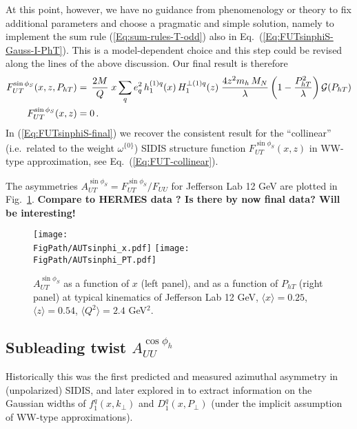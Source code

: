 \documentclass[a4paper,11pt]{article}
\newcommand{\blue}[1]{{\color{blue} #1}}
\newcommand{\la}{\langle}
\newcommand{\ra}{\rangle}
\newcommand{\PS}[1]{\blue{\bf\boldmath #1}}
\def\Phperp{P_{hT}}
\def\kperp{k_\perp}
\def\pperp{P_\perp}
\newcommand*{\FigPath}{./figs}%
\begin{document}
At this point, however, we have no guidance from phenomenology or theory 
to fix additional parameters and choose a pragmatic and simple solution, 
namely to implement the sum rule (\ref{Eq:sum-rules-T-odd}) also in 
Eq.~(\ref{Eq:FUTsinphiS-Gauss-I-PhT}). This is
a model-dependent choice and this step could be revised along the
lines of the above discussion. Our final result is therefore
\begin{alignat}{1}
	F_{UT}^{\sin\phi_S}(x,z,\Phperp) 
	&= \,\frac{2M}{Q}\;x\sum_q e_q^2\,
	h_1^{(1)q}(x)\,H_1^{\perp(1)q}(z)\; \frac{4z^2 m_h\,M_N}{\lambda} 
	\left(1-\frac{\Phperp^2}{\lambda}\right) {\cal G}(\Phperp) 
	\nonumber\\
  	F_{UT}^{\sin\phi_S}(x,z) 
	&= 0 \, .	\label{Eq:FUTsinphiS-final}
\end{alignat}
In (\ref{Eq:FUTsinphiS-final}) we recover the consistent result for 
the ``collinear'' (i.e.\ related to the weight $\omega^{\{0\}}$) SIDIS 
structure function $F_{UT}^{\sin\phi_S}(x,z)$ in WW-type approximation, 
see Eq.~(\ref{Eq:FUT-collinear}). 

The asymmetries $A_{UT}^{\sin\phi_S}=F_{UT}^{\sin\phi_S}/F_{UU}$  for 
Jefferson Lab 12 GeV are plotted in Fig.~\ref{autsinphi_jlab}.
\PS{Compare to HERMES data \cite{Schnell:2010zza}?
Is there by now final data? Will be interesting!}


\begin{figure}[ht]
\centering
\texttt{[image: \\FigPath/AUTsinphi\_x.pdf]} 
\texttt{[image: \\FigPath/AUTsinphi\_PT.pdf]}
\caption{\label{autsinphi_jlab} $A_{UT}^{\sin\phi_S}$  as a function of $ x $ (left panel), and   as a function of $P_{hT}$ (right panel) at typical kinematics of Jefferson Lab 12 GeV, $\la x\ra = 0.25$, $\la z\ra = 0.54$, $\la Q^2\ra = 2.4$ GeV$^2$.
}
\end{figure}

 

\newpage
\subsection{\boldmath Subleading twist  $A_{UU}^{\cos\phi_h}$ }
\label{Sec-7.7:FUUcosphi}

Historically this was the first predicted \cite{Cahn:1978se} and measured
\cite{Aubert:1983cz} azimuthal asymmetry in (unpolarized) SIDIS, and
later explored in \cite{Anselmino:2005nn} to extract information on the 
Gaussian widths of $f_1^q(x,\kperp)$ and $D_1^q(x,\pperp)$ (under the 
implicit assumption of WW-type approximations).
\end{document}

